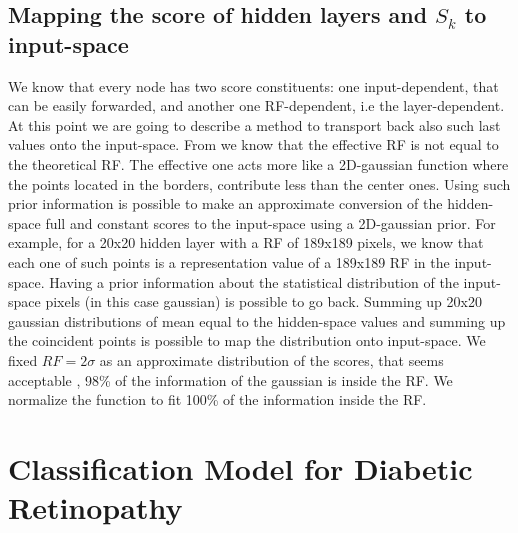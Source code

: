 \documentclass[preprint]{elsarticle}
\theoremstyle{definition} %
\theoremstyle{remark}
\begin{document}
\subsection{Mapping the score of hidden layers and $S_k$ to input-space}\label{sec:mapping-input}

We know that every node has two score constituents: one input-dependent, that can be easily forwarded, and another one RF-dependent, i.e the layer-dependent. At this point we are going to describe a method to transport back also such last values onto the input-space. From \cite{luo2016understanding} we know that the effective RF is not equal to the theoretical RF. The effective one acts more like a 2D-gaussian function where the points located in the borders, contribute less than the center ones. Using such prior information is possible to make an approximate conversion of the hidden-space full and constant scores to the input-space using a 2D-gaussian prior. For example, for a 20x20 hidden layer with a RF of 189x189 pixels, we know that each one of such points is a representation value of a 189x189 RF in the input-space. Having a prior information about the statistical distribution of the input-space pixels (in this case gaussian) is possible to go back. Summing up 20x20 gaussian distributions of mean equal to the hidden-space values and summing up the coincident points is possible to map the distribution onto input-space. We fixed $RF = 2\sigma$ as an approximate distribution of the scores, that seems acceptable \cite{luo2016understanding},  98\% of the information of the gaussian is inside the RF. We normalize the function to fit 100\% of the information inside the RF.

\section{Classification Model for Diabetic Retinopathy}\label{sec:class}

\end{document}
